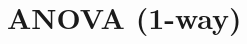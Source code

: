 \documentclass[11pt,fleqn]{book} %
\begin{document}










\chapter{ANOVA (1-way)}
\end{document}
